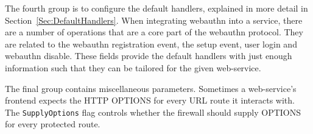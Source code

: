 
The fourth group is to configure the default handlers, explained in more detail in Section~\ref{Sec:DefaultHandlers}. When integrating webauthn into a service, there are a number of operations that are a core part of the webauthn protocol. They are related to the webauthn registration event, the setup event, user login and webauthn disable. These fields provide the default handlers with just enough information such that they can be tailored for the given web-service.








The final group contains miscellaneous parameters. Sometimes a web-service's frontend expects the HTTP OPTIONS for every URL route it interacts with. The \lstinline{SupplyOptions} flag controls whether the firewall should supply OPTIONS for every protected route.



